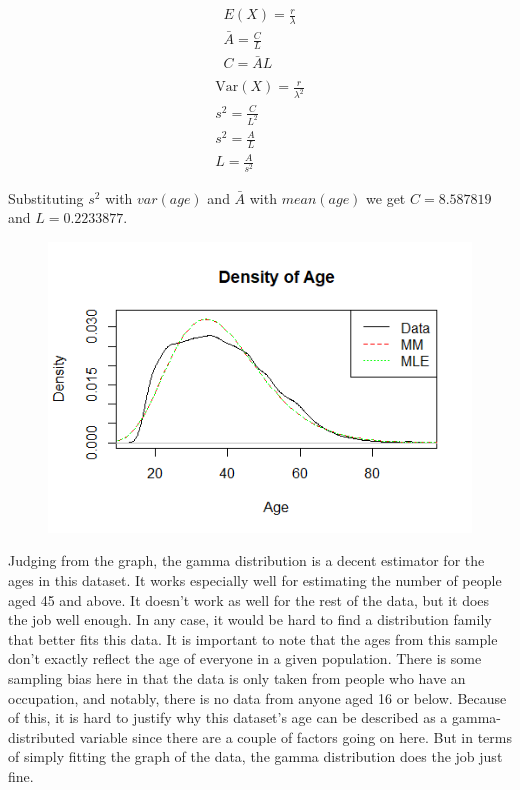 \documentclass[12pt, a4paper, oneside]{report}
\begin{document}






\begin{multicols}{2}
  \begin{align*}
  E(X) = \frac{r}{\lambda} \\
  \bar{A} = \frac{C}{L} \\
  C = \bar{A}L \\
  \end{align*}
\columnbreak
  \begin{align*}
  \text{Var}(X) = \frac{r}{\lambda^2} \\
  s^2 = \frac{C}{L^2} \\
  s^2 = \frac{A}{L} \\
  L = \frac{A}{s^2}
  \end{align*}
\end{multicols}



Substituting $s^2$ with $var(age)$ and $\bar{A}$ with $mean(age)$ we get $C = 8.587819$ and $L = 0.2233877$.

\begin{figure}[h]
  \centering
  \includegraphics[width=0.7\linewidth]{gammaDensityA.png}
\end{figure}

Judging from the graph, the gamma distribution is a decent estimator for the ages in this dataset. It works especially well for estimating the number of people aged 45 and above. It doesn’t work as well for the rest of the data, but it does the job well enough. In any case, it would be hard to find a distribution family that better fits this data. 
It is important to note that the ages from this sample don’t exactly reflect the age of everyone in a given population. There is some sampling bias here in that the data is only taken from people who have an occupation, and notably, there is no data from anyone aged 16 or below. Because of this, it is hard to justify why this dataset’s age can be described as a gamma-distributed variable since there are a couple of factors going on here.
But in terms of simply fitting the graph of the data, the gamma distribution does the job just fine.
\end{document}
